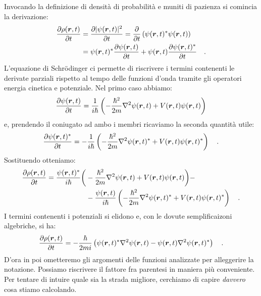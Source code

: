 Invocando la definizione di densità di probabilità e muniti di pazienza si comincia la derivazione:
\[
    \begin{aligned}
        \pdv{\rho(\bm{r}, t)}{t} &= \pdv{|\psi(\bm{r}, t)|^2}{t} = \pdv{}{t}\, (\psi(\bm{r}, t)^*\psi(\bm{r}, t)) \\
        &= \psi(\bm{r}, t)^*\pdv{\psi(\bm{r}, t)}{t} + \psi(\bm{r}, t)\pdv{\psi(\bm{r}, t)^*}{t} \quad.
    \end{aligned}
\]
L'equazione di Schrödinger ci permette di riscrivere i termini contenenti le derivate parziali rispetto al tempo delle funzioni d'onda tramite gli operatori energia cinetica e potenziale. Nel primo caso abbiamo:
\[
    \pdv{\psi(\bm{r}, t)}{t} = \frac{1}{i\hbar} \left( -\frac{\hbar^2}{2m}\nabla^2 \psi(\bm{r}, t) + V(\bm{r}, t)\psi(\bm{r}, t) \right)
\]
e, prendendo il coniugato ad ambo i membri ricaviamo la seconda quantità utile:
\[
    \pdv{\psi(\bm{r}, t)^*}{t} = -\frac{1}{i\hbar} \left( -\frac{\hbar^2}{2m}\nabla^2 \psi(\bm{r}, t)^* + V(\bm{r}, t)\psi(\bm{r}, t)^* \right) \quad.
\]
Sostituendo otteniamo:
\[
    \begin{aligned}
        \pdv{\rho(\bm{r}, t)}{t} = \frac{\psi(\bm{r}, t)^*}{i\hbar}\bigg( &-\frac{\hbar^2}{2m}\nabla^2 \psi(\bm{r}, t) + V(\bm{r}, t)\psi(\bm{r}, t) \bigg) -\\ &- \frac{\psi(\bm{r}, t)}{i\hbar}\left( -\frac{\hbar^2}{2m}\nabla^2 \psi(\bm{r}, t)^* + V(\bm{r}, t)\psi(\bm{r}, t)^* \right) \quad.
    \end{aligned}
\]  
I termini contenenti i potenziali si elidono e, con le dovute semplificaizoni algebriche, si ha:
\begin{equation}
        \pdv{\rho(\bm{r}, t)}{t} = -\frac{\hbar}{2mi}\left(\psi(\bm{r}, t)^*\nabla^2\psi(\bm{r}, t) - \psi(\bm{r}, t)\nabla^2\psi(\bm{r}, t)^*\right) \quad.
        \label{eq:step_eq_continuità}
\end{equation}
D'ora in poi ometteremo gli argomenti delle funzioni analizzate per alleggerire la notazione. 
Possiamo riscrivere il fattore fra parentesi in maniera più conveniente. Per tentare di intuire quale sia la strada migliore, cerchiamo di capire \emph{davvero} cosa stiamo calcolando. 

